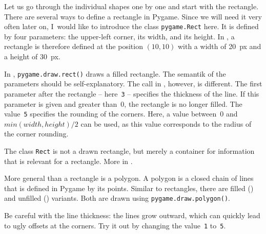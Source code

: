 \begin{figure}%
	\begin{center}%
		\vspace{-1cm}%
	\end{center}%
\end{figure}%
Let us go through the individual shapes one by one and start with the
rectangle. There are several ways to define a rectangle in Pygame. Since we will need it very often later on, I~would like to introduce the class \texttt{pygame.Rect} here. It is defined by four parameters: the upper-left corner, its width, and its height. In , a rectangle is therefore defined at the position $(10,10)$ with a width of \SI{20}{px} and a height of \SI{30}{px}.


In , \texttt{pygame.draw.rect()} draws a filled rectangle. The \Gls{semantik} of the parameters should be self-explanatory.
The call in , however, is different. The first parameter after the rectangle -- here~\texttt{3} -- specifies the thickness of the line. If this parameter is given and greater than~0, the rectangle is no longer filled. The value~\texttt{5} specifies the rounding of the corners. Here, a value between~0 and $min(width, height)/2$ can be used, as this value corresponds to the radius of the corner rounding.

\begin{hintbox}[Hint]
	The class \texttt{Rect} is not a drawn rectangle, but merely a container for information that is relevant for a rectangle. More in .
\end{hintbox}

More general than a rectangle is a \Gls{polygon}. A polygon is a closed chain of lines that is defined in Pygame by its points. Similar to rectangles, there are filled () and unfilled () variants. Both are drawn using \texttt{pygame.draw.polygon()}. 

\begin{warningbox}[Warning]
	Be careful with the line thickness: the lines grow outward, which can quickly lead to ugly offsets at the corners. Try it out by changing the value~\texttt{1} to~\texttt{5}.
\end{warningbox}

